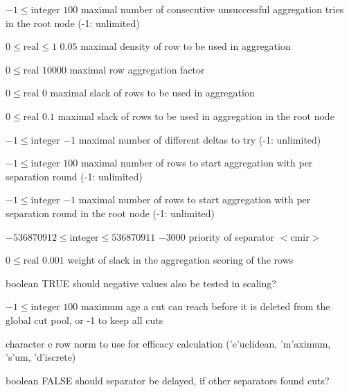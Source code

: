 %
{$-1\leq\textrm{integer}$}%
{$100$}%
{maximal number of consecutive unsuccessful aggregation tries in the root node (-1: unlimited)}%
{}

%
{$0\leq\textrm{real}\leq1$}%
{$0.05$}%
{maximal density of row to be used in aggregation}%
{}

%
{$0\leq\textrm{real}$}%
{$10000$}%
{maximal row aggregation factor}%
{}

%
{$0\leq\textrm{real}$}%
{$0$}%
{maximal slack of rows to be used in aggregation}%
{}

%
{$0\leq\textrm{real}$}%
{$0.1$}%
{maximal slack of rows to be used in aggregation in the root node}%
{}

%
{$-1\leq\textrm{integer}$}%
{$-1$}%
{maximal number of different deltas to try (-1: unlimited)}%
{}

%
{$-1\leq\textrm{integer}$}%
{$100$}%
{maximal number of rows to start aggregation with per separation round (-1: unlimited)}%
{}

%
{$-1\leq\textrm{integer}$}%
{$-1$}%
{maximal number of rows to start aggregation with per separation round in the root node (-1: unlimited)}%
{}

%
{$-536870912\leq\textrm{integer}\leq536870911$}%
{$-3000$}%
{priority of separator $<$cmir$>$}%
{}

%
{$0\leq\textrm{real}$}%
{$0.001$}%
{weight of slack in the aggregation scoring of the rows}%
{}

%
{boolean}%
{TRUE}%
{should negative values also be tested in scaling?}%
{}

%
{$-1\leq\textrm{integer}$}%
{$100$}%
{maximum age a cut can reach before it is deleted from the global cut pool, or -1 to keep all cuts}%
{}

%
{character}%
{e}%
{row norm to use for efficacy calculation ('e'uclidean, 'm'aximum, 's'um, 'd'iscrete)}%
{}

%
{boolean}%
{FALSE}%
{should separator be delayed, if other separators found cuts?}%
{}

